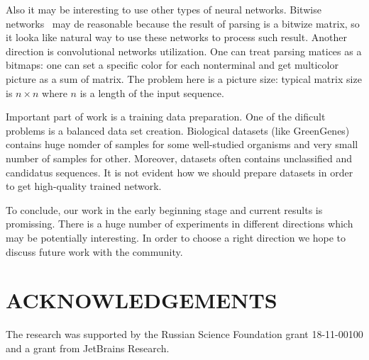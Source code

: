 \documentclass[a4paper,twoside]{article}
\begin{document}
Also it may be interesting to use other types of neural networks.
Bitwise networks~\cite{DBLP:journals:corr:KimS16} may de reasonable because the result of parsing is a bitwize matrix, so it looka like natural way to use these networks to process such result. 
Another direction is convolutional networks utilization.
One can treat parsing matices as a bitmaps: one can set a specific color for each nonterminal and get multicolor picture as a sum of matrix.
The problem here is a picture size: typical matrix size is $n \times n$ where $n$ is a length of the input sequence.

Important part of work is a training data preparation.
One of the dificult problems is a balanced data set creation.
Biological datasets (like GreenGenes) contains huge nomder of samples for some well-studied organisms and very small number of samples for other.
Moreover, datasets often contains unclassified and candidatus sequences.
It is not evident how  we should prepare datasets in order to get high-quality trained network.

To conclude, our work in the early beginning stage and current results is promissing. 
There is a huge number of experiments in different directions which may be potentially interesting.
In order to choose a right direction we hope to discuss future work with the community.


\section*{\uppercase{Acknowledgements}}

\noindent The research was supported by the Russian Science Foundation grant 18-11-00100 and a grant from JetBrains Research.




{\small
}


\vfill
\end{document}
